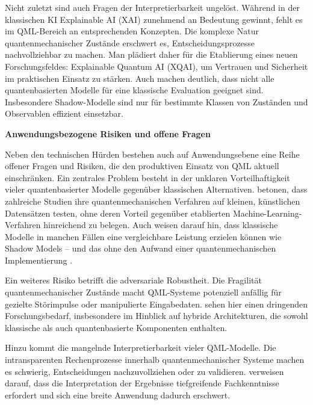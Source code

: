 Nicht zuletzt sind auch Fragen der Interpretierbarkeit ungelöst. Während in der klassischen KI Explainable AI (XAI) zunehmend an Bedeutung gewinnt, fehlt es im QML-Bereich an entsprechenden Konzepten. Die komplexe Natur quantenmechanischer Zustände erschwert es, Entscheidungsprozesse nachvollziehbar zu machen. Man plädiert daher für die Etablierung eines neuen Forschungsfeldes: Explainable Quantum AI (XQAI), um Vertrauen und Sicherheit im praktischen Einsatz zu stärken. Auch \cite{jerbiShadowsQuantumMachine2024} machen deutlich, dass nicht alle quantenbasierten Modelle für eine klassische Evaluation geeignet sind. Insbesondere Shadow-Modelle sind nur für bestimmte Klassen von Zuständen und Observablen effizient einsetzbar.



\vspace{1em}
\noindent\textbf{Anwendungsbezogene Risiken und offene Fragen}

\noindent
Neben den technischen Hürden bestehen auch auf Anwendungsebene eine Reihe offener Fragen und Risiken, die den produktiven Einsatz von QML aktuell einschränken. Ein zentrales Problem besteht in der unklaren Vorteilhaftigkeit vieler quantenbasierter Modelle gegenüber klassischen Alternativen. \cite{bowlesBetterClassicalSubtle2024} betonen, dass zahlreiche Studien ihre quantenmechanischen Verfahren auf kleinen, künstlichen Datensätzen testen, ohne deren Vorteil gegenüber etablierten Machine-Learning-Verfahren hinreichend zu belegen. Auch \cite{jerbiShadowsQuantumMachine2024} weisen darauf hin, dass klassische Modelle in manchen Fällen eine vergleichbare Leistung erzielen können wie Shadow Models – und das ohne den Aufwand einer quantenmechanischen Implementierung \cite{jerbiShadowsQuantumMachine2024}.

Ein weiteres Risiko betrifft die adversariale Robustheit. Die Fragilität quantenmechanischer Zustände macht QML-Systeme potenziell anfällig für gezielte Störimpulse oder manipulierte Eingabedaten. \cite{gujjuQuantumMachineLearning2024} sehen hier einen dringenden Forschungsbedarf, insbesondere im Hinblick auf hybride Architekturen, die sowohl klassische als auch quantenbasierte Komponenten enthalten.

Hinzu kommt die mangelnde Interpretierbarkeit vieler QML-Modelle. Die intransparenten Rechenprozesse innerhalb quantenmechanischer Systeme machen es schwierig, Entscheidungen nachzuvollziehen oder zu validieren. \cite{tychola_quantum_2023} verweisen darauf, dass die Interpretation der Ergebnisse tiefgreifende Fachkenntnisse erfordert und sich eine breite Anwendung dadurch erschwert.

